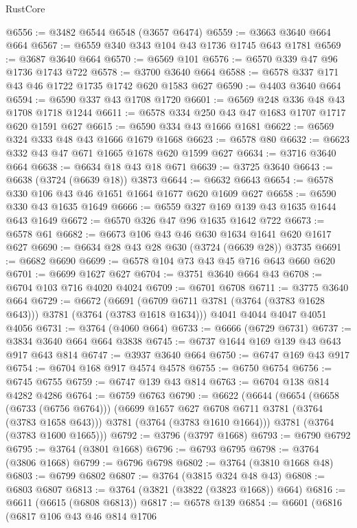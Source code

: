 \begin{lexlean}{RustCore}
\begin{coremodule}
@6556 := @3482 @6544 @6548 (@3657 @6474)
@6559 := @3663 @3640 @664 @664
@6567 := @6559 @340 @343 @104 @43 @1736 @1745 @643 @1781
@6569 := @3687 @3640 @664
@6570 := @6569 @101
@6576 := @6570 @339 @47 @96 @1736 @1743 @722
@6578 := @3700 @3640 @664
@6588 := @6578 @337 @171 @43 @46 @1722 @1735 @1742 @620 @1583 @627
@6590 := @4403 @3640 @664
@6594 := @6590 @337 @43 @1708 @1720
@6601 := @6569 @248 @336 @48 @43 @1708 @1718 @1244
@6611 := @6578 @334 @250 @43 @47 @1683 @1707 @1717 @620 @1591 @627
@6615 := @6590 @334 @43 @1666 @1681
@6622 := @6569 @324 @333 @48 @43 @1666 @1679 @1668
@6623 := @6578 @80
@6632 := @6623 @332 @43 @47 @671 @1665 @1678 @620 @1599 @627
@6634 := @3716 @3640 @664
@6638 := @6634 @18 @43 @18 @671
@6639 := @3725 @3640
@6643 := @6638 (@3724 (@6639 @18)) @3873
@6644 := @6632 @6643
@6654 := @6578 @330 @106 @43 @46 @1651 @1664 @1677 @620 @1609 @627
@6658 := @6590 @330 @43 @1635 @1649
@6666 := @6559 @327 @169 @139 @43 @1635 @1644 @643 @1649
@6672 := @6570 @326 @47 @96 @1635 @1642 @722
@6673 := @6578 @61
@6682 := @6673 @106 @43 @46 @630 @1634 @1641 @620 @1617 @627
@6690 := @6634 @28 @43 @28 @630 (@3724 (@6639 @28)) @3735
@6691 := @6682 @6690
@6699 := @6578 @104 @73 @43 @45 @716 @643 @660 @620
@6701 := @6699 @1627 @627
@6704 := @3751 @3640 @664 @43
@6708 := @6704 @103 @716 @4020 @4024
@6709 := @6701 @6708
@6711 := @3775 @3640 @664
@6729 := @6672
    (@6691 (@6709 @6711 @3781 (@3764 (@3783 @1628 @643))) @3781 (@3764 (@3783 @1618 @1634)))
    @4041
    @4044
    @4047
    @4051
    @4056
@6731 := @3764 (@4060 @664)
@6733 := @6666 (@6729 @6731)
@6737 := @3834 @3640 @664 @664 @3838
@6745 := @6737 @1644 @169 @139 @43 @643 @917 @643 @814
@6747 := @3937 @3640 @664
@6750 := @6747 @169 @43 @917
@6754 := @6704 @168 @917 @4574 @4578
@6755 := @6750 @6754
@6756 := @6745 @6755
@6759 := @6747 @139 @43 @814
@6763 := @6704 @138 @814 @4282 @4286
@6764 := @6759 @6763
@6790 := @6622
    (@6644
      (@6654
        (@6658 (@6733 (@6756 @6764)))
        (@6699 @1657 @627 @6708 @6711 @3781 (@3764 (@3783 @1658 @643)))
        @3781
        (@3764 (@3783 @1610 @1664)))
      @3781
      (@3764 (@3783 @1600 @1665)))
@6792 := @3796 (@3797 @1668)
@6793 := @6790 @6792
@6795 := @3764 (@3801 @1668)
@6796 := @6793 @6795
@6798 := @3764 (@3806 @1668)
@6799 := @6796 @6798
@6802 := @3764 (@3810 @1668 @48)
@6803 := @6799 @6802
@6807 := @3764 (@3815 @324 @48 @43)
@6808 := @6803 @6807
@6813 := @3764 (@3821 (@3822 (@3823 @1668)) @664)
@6816 := @6611 (@6615 (@6808 @6813))
@6817 := @6578 @139
@6854 := @6601
    (@6816
      (@6817
        @106
        @43
        @46
        @814
        @1706

\end{coremodule}
\end{lexlean}
